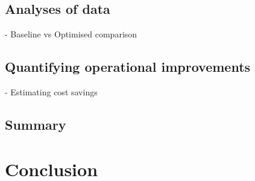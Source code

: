 	\subsection{Analyses of data}
		- Baseline vs Optimised comparison \\
	\subsection{Quantifying operational improvements}
		- Estimating cost savings
	\subsection{Summary}
\section{Conclusion}
